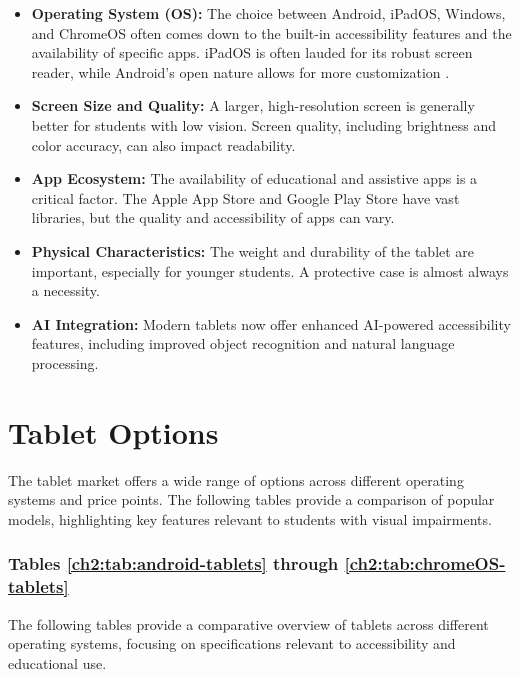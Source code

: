 \begin{itemize}
	\item \textbf{Operating System (OS):} The choice between Android, iPadOS, Windows, and ChromeOS often comes down to the built-in accessibility features and the availability of specific apps. iPadOS is often lauded for its robust  screen reader, while Android's open nature allows for more customization \supercite{AndroidAccessibility}.
	\item \textbf{Screen Size and Quality:} A larger, high-resolution screen is generally better for students with low vision. Screen quality, including brightness and color accuracy, can also impact readability.
	\item \textbf{App Ecosystem:} The availability of educational and assistive apps is a critical factor. The Apple App Store and Google Play Store have vast libraries, but the quality and accessibility of apps can vary.
	\item \textbf{Physical Characteristics:} The weight and durability of the tablet are important, especially for younger students. A protective case is almost always a necessity.
	\item \textbf{AI Integration:} Modern tablets now offer enhanced AI-powered accessibility features, including improved object recognition and natural language processing.
\end{itemize}

\section{Tablet Options}\label{ch2:sec:tablet-options}

The tablet market offers a wide range of options across different operating systems and price points. The following tables provide a comparison of popular models, highlighting key features relevant to students with visual impairments.

\subsubsection{Tables \ref{ch2:tab:android-tablets} through \ref{ch2:tab:chromeOS-tablets}}
The following tables provide a comparative overview of tablets across different operating systems, focusing on specifications relevant to \gls{accessibility} and educational use.

